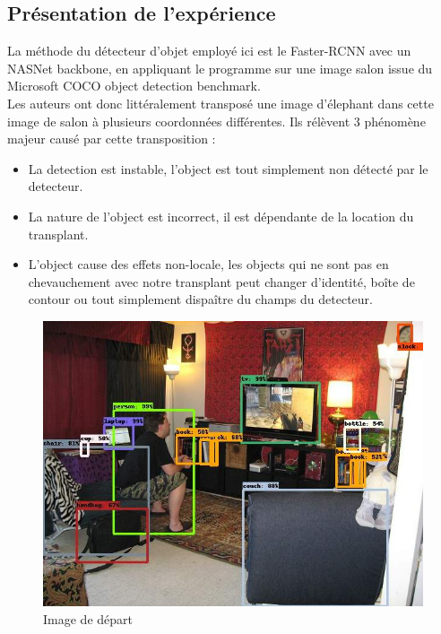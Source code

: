 \documentclass[12pt, letterpaper]{article}
\begin{document}
\subsection{Présentation de l'expérience}
La méthode du détecteur d'objet employé ici est le Faster-RCNN avec un NASNet backbone, en appliquant le programme sur 
une image salon issue du Microsoft COCO object detection benchmark. \\
Les auteurs ont donc littéralement transposé une image d'élephant dans cette image de salon à plusieurs
coordonnées différentes. Ils rélèvent 3 phénomène majeur causé par cette transposition :
\begin{itemize}
    \item La detection est instable, l'object est tout simplement non détecté par le detecteur.
    \item La nature de l'object est incorrect, il est dépendante de la location du transplant.
    \item L'object cause des effets non-locale, les objects qui ne sont pas en chevauchement avec notre transplant peut changer d'identité, boîte de contour ou tout simplement 
        dispaître du champs du detecteur.
\end{itemize}
\begin{figure}[H]
    \includegraphics[width=\linewidth]{img/fig12.jpg}
    \caption{Image de départ}
    \label{fig:L11}
\end{figure}
\end{document}
